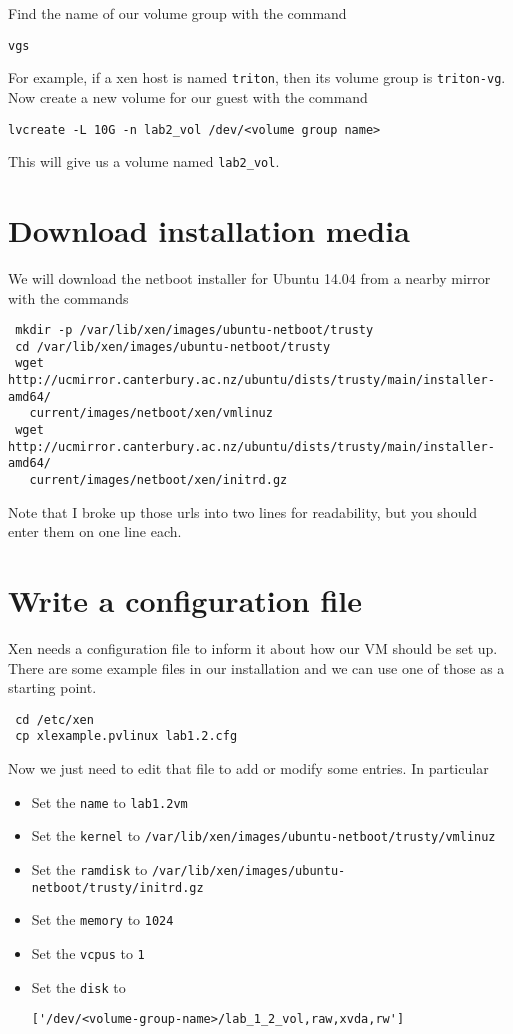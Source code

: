 \documentclass{article}
\begin{document}
 Find the name of our volume group with the command
 
 \texttt{vgs}
 
 For example, if a xen host is named \texttt{triton}, then its volume group is \texttt{triton-vg}.
 Now create a new volume for our guest with the command 
 
 \texttt{lvcreate -L 10G -n lab2\_vol /dev/<volume group name>}
 
 This will give us a volume named \texttt{lab2\_vol}.

 \section{Download installation media}
 We will download the netboot installer for Ubuntu 14.04 from a nearby mirror with the commands
 
 \begin{verbatim}
 mkdir -p /var/lib/xen/images/ubuntu-netboot/trusty
 cd /var/lib/xen/images/ubuntu-netboot/trusty
 wget http://ucmirror.canterbury.ac.nz/ubuntu/dists/trusty/main/installer-amd64/
   current/images/netboot/xen/vmlinuz
 wget http://ucmirror.canterbury.ac.nz/ubuntu/dists/trusty/main/installer-amd64/
   current/images/netboot/xen/initrd.gz
 \end{verbatim}
 
 Note that I broke up those urls into two lines for readability, but you should enter them on one line each.
 
 \section{Write a configuration file}
 Xen needs a configuration file to inform it about how our VM should be set up. There are some example files in our installation
 and we can use one of those as a starting point.
 
 \begin{verbatim}
 cd /etc/xen
 cp xlexample.pvlinux lab1.2.cfg
 \end{verbatim}
 
 Now we just need to edit that file to add or modify some entries. In particular
 
 \begin{itemize}
  \item Set the \texttt{name} to \texttt{lab1.2vm}
  \item Set the \texttt{kernel} to \texttt{/var/lib/xen/images/ubuntu-netboot/trusty/vmlinuz}
  \item Set the \texttt{ramdisk} to \texttt{/var/lib/xen/images/ubuntu-netboot/trusty/initrd.gz}
  \item Set the \texttt{memory} to \texttt{1024}
   \item Set the \texttt{vcpus} to \texttt{1}
   \item Set the \texttt{disk} to \begin{verbatim}['/dev/<volume-group-name>/lab_1_2_vol,raw,xvda,rw']\end{verbatim}
 \end{itemize}
 
\end{document}
